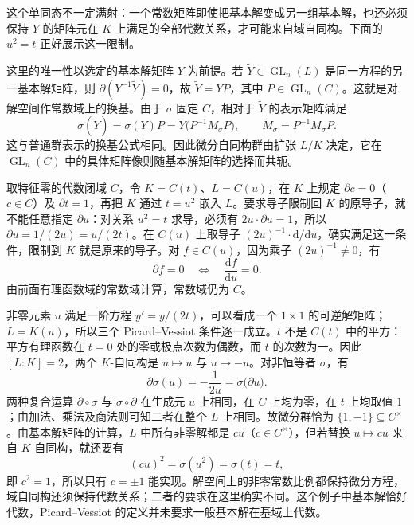 这个单同态不一定满射：一个常数矩阵即使把基本解变成另一组基本解，也还必须保持 \(Y\) 的矩阵元在 \(K\) 上满足的全部代数关系，才可能来自域自同构。下面的 \(u^2=t\) 正好展示这一限制。

\ProseParagraphBreak
这里的唯一性以选定的基本解矩阵 \(Y\) 为前提。若 \(\widetilde Y\in\operatorname{GL}_n(L)\) 是同一方程的另一基本解矩阵，则 \(\partial(Y^{-1}\widetilde Y)=0\)，故 \(\widetilde Y=YP\)，其中 \(P\in\operatorname{GL}_n(C)\)。这就是对解空间作常数域上的换基。由于 \(\sigma\) 固定 \(C\)，相对于 \(\widetilde Y\) 的表示矩阵满足
\[
	\sigma(\widetilde Y)=\sigma(Y)P =\widetilde Y\bigl(P^{-1}M_\sigma P\bigr), \qquad \widetilde M_\sigma=P^{-1}M_\sigma P.
\]
这与普通群表示的换基公式相同。因此微分自同构群由扩张 \(L/K\) 决定，它在 \(\operatorname{GL}_n(C)\) 中的具体矩阵像则随基本解矩阵的选择而共轭。

\ProseParagraphBreak
取特征零的代数闭域 \(C\)，令 \(K=C(t)\)、\(L=C(u)\)，在 \(K\) 上规定 \(\partial c=0\)（\(c\in C\)）及 \(\partial t=1\)，再把 \(K\) 通过 \(t=u^2\) 嵌入 \(L\)。要求导子限制回 \(K\) 的原导子，就不能任意指定 \(\partial u\)：对关系 \(u^2=t\) 求导，必须有 \(2u\cdot\partial u=1\)，所以 \(\partial u=1/(2u)=u/(2t)\)。在 \(C(u)\) 上取导子 \((2u)^{-1}\cdot\mathrm{d}/\mathrm{d}u\)，确实满足这一条件，限制到 \(K\) 就是原来的导子。对 \(f\in C(u)\)，因为乘子 \((2u)^{-1}\neq0\)，有
\[
	\partial f=0\quad\Longleftrightarrow\quad \frac{\mathrm{d}f}{\mathrm{d}u}=0.
\]
由前面有理函数域的常数域计算，常数域仍为 \(C\)。

\ProseParagraphBreak
非零元素 \(u\) 满足一阶方程 \(y'=y/(2t)\)，可以看成一个 \(1\times1\) 的可逆解矩阵；\(L=K(u)\)，所以三个 Picard--Vessiot 条件逐一成立。\(t\) 不是 \(C(t)\) 中的平方：平方有理函数在 \(t=0\) 处的零或极点次数为偶数，而 \(t\) 的次数为一。因此 \([L:K]=2\)，两个 \(K\)-自同构是 \(u\mapsto u\) 与 \(u\mapsto-u\)。对非恒等者 \(\sigma\)，有
\[
	\partial\sigma(u)=-\frac1{2u} =\sigma\bigl(\partial u\bigr).
\]
两种复合运算 \(\partial\circ\sigma\) 与 \(\sigma\circ\partial\) 在生成元 \(u\) 上相同，在 \(C\) 上均为零，在 \(t\) 上均取值 \(1\)；由加法、乘法及商法则可知二者在整个 \(L\) 上相同。故微分群恰为 \(\{1,-1\}\subseteq C^\times\)。由基本解矩阵的计算，\(L\) 中所有非零解都是 \(cu\)（\(c\in C^\times\)），但若替换 \(u\mapsto cu\) 来自 \(K\)-自同构，就还要有
\[
	(cu)^2=\sigma(u^2)=\sigma(t)=t,
\]
即 \(c^2=1\)，所以只有 \(c=\pm1\) 能实现。解空间上的非零常数比例都保持微分方程，域自同构还须保持代数关系；二者的要求在这里确实不同。这个例子中基本解恰好代数，Picard--Vessiot 的定义并未要求一般基本解在基域上代数。

